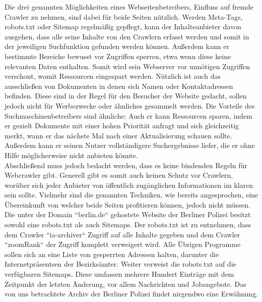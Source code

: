 Die drei genannten Möglichkeiten eines Webseitenbetreibers, Einfluss auf fremde Crawler zu nehmen, sind dabei für beide Seiten nützlich. Werden Meta-Tags, robots.txt oder Sitemap regelmäßig gepflegt, kann der Inhalteanbieter davon ausgehen, dass alle seine Inhalte von den Crawlern erfasst werden und somit in der jeweiligen Suchfunktion gefunden werden können. Außerdem kann er bestimmte Bereiche bewusst vor Zugriffen sperren, etwa wenn diese keine relevanten Daten enthalten. Somit wird sein Webserver vor unnötigen Zugriffen verschont, womit Ressourcen eingespart werden. Nützlich ist auch das ausschließen von Dokumenten in denen sich Namen oder Kontaktadressen befinden. Diese sind in der Regel für den Besucher der Website gedacht, sollen jedoch nicht für Werbezwecke oder ähnliches gesammelt werden. Die Vorteile des Suchmaschinenbetreibers sind ähnliche: Auch er kann Ressourcen sparen, indem er gezielt Dokumente mit einer hohen Priorität anfragt und sich gleichzeitig merkt, wann er das nächste Mal nach einer Aktualisierung schauen sollte. Außerdem kann er seinen Nutzer vollständigere Suchergebnisse liefer, die er ohne Hilfe möglicherweise nicht anbieten könnte.\\
Abschließend muss jedoch bedacht werden, dass es keine bindenden Regeln für Webcrawler gibt. Generell gibt es somit auch keinen Schutz vor Crawlern, worüber sich jeder Anbieter von öffentlich zugänglichen Informationen im klaren sein sollte. Vielmehr sind die genannten Techniken, wie bereits angesprochen, eine Übereinkunft von welcher beide Seiten profitieren können, jedoch nicht müssen.\\
Die unter der Domain ``berlin.de`` gehostete Website der Berliner Polizei besitzt sowohl eine robots.txt als auch Sitemaps. Der robots.txt ist zu entnehmen, dass dem Crawler ``ia-archiver`` Zugriff auf alle Inhalte gegeben und dem Crawler ``zoomRank`` der Zugriff komplett verweigert wird. Alle Übrigen Programme sollen sich an eine Liste von gesperrten Adressen halten, darunter die Internetpräsentsen der Bezirksämter. Weiter verweist die robots.txt auf die verfügbaren Sitemaps. Diese umfassen mehrere Hundert Einträge mit dem Zeitpunkt der letzten Änderung, vor allem Nachrichten und Jobangebote. Das von uns betrachtete Archiv der Berliner Polizei findet nirgendwo eine Erwähnung.

